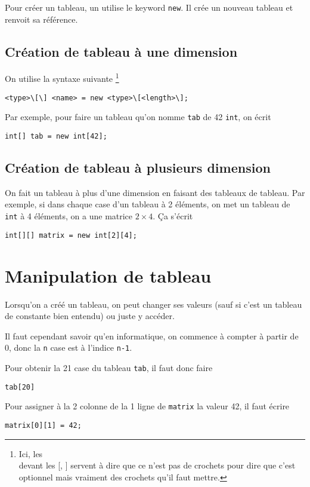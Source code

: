 Pour créer un tableau, un utilise le keyword \lstinline|new|.
Il crée un nouveau tableau et renvoit sa référence.

\subsection{Création de tableau à une dimension}
On utilise la syntaxe suivante
\footnote{Ici, les \\ devant les [, ] servent à dire que ce n'est
pas de crochets pour dire que c'est optionnel mais vraiment des
crochets qu'il faut mettre.}
\begin{lstlisting}
<type>\[\] <name> = new <type>\[<length>\];
\end{lstlisting}

Par exemple,
pour faire un tableau qu'on nomme \lstinline|tab| de 42 \lstinline|int|,
on écrit
\begin{lstlisting}
int[] tab = new int[42];
\end{lstlisting}

\subsection{Création de tableau à plusieurs dimension}
On fait un tableau à plus d'une dimension en faisant des tableaux de tableau.
Par exemple, si dans chaque case d'un tableau à 2 éléments, on met un
tableau de \lstinline|int| à 4 éléments, on a une matrice $2 \times 4$.
Ça s'écrit
\begin{lstlisting}
int[][] matrix = new int[2][4];
\end{lstlisting}

\section{Manipulation de tableau}
Lorsqu'on a créé un tableau, on peut changer ses valeurs (sauf si c'est un
tableau de constante bien entendu) ou juste y accéder.

Il faut cependant savoir qu'en informatique, on commence à compter à partir
de 0, donc la \lstinline|n|\ieme{} case est à l'indice \lstinline|n-1|.

Pour obtenir la 21\ieme{} case du tableau \lstinline|tab|, il faut donc faire
\begin{lstlisting}
tab[20]
\end{lstlisting}

Pour assigner à la 2\ieme{} colonne de la 1\iere{} ligne de \lstinline|matrix|
la valeur 42, il faut écrire
\begin{lstlisting}
matrix[0][1] = 42;
\end{lstlisting}

